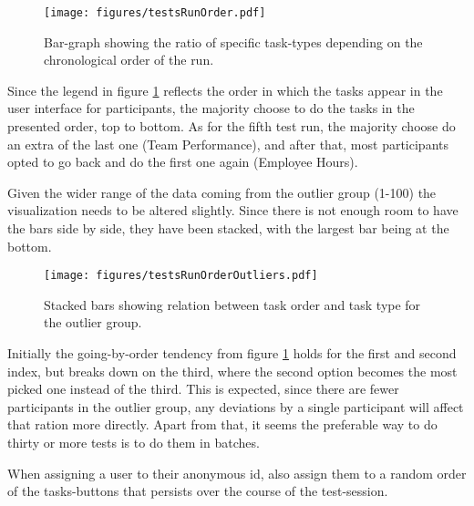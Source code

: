 		\vspace{-0.2cm}
    \begin{figure}[ht!]
      \centering
      \texttt{[image: figures/testsRunOrder.pdf]}
			\vspace{-0.1cm}
      \caption{
        Bar-graph showing the ratio of specific task-types depending on
        the chronological order of the run.
      }
      \label{label_testsRunOrder}
    \end{figure}

		\vspace{-0.1cm}
    Since the legend in figure \ref{label_testsRunOrder} reflects the order
    in which the tasks appear in the user interface for participants, the
    majority choose to do the tasks in the presented order, top to bottom.
    As for the fifth test run, the majority choose do an extra of the last
    one (Team Performance), and after that, most participants opted to go
    back and do the first one again (Employee Hours).

    Given the wider range of the data coming from the outlier group (1-100)
    the visualization needs to be altered slightly. Since there is not
    enough room to have the bars side by side, they have been stacked, with
    the largest bar being at the bottom.

		\vspace{-0.2cm}
    \begin{figure}[ht!]
      \centering
      \texttt{[image: figures/testsRunOrderOutliers.pdf]}
			\vspace{-0.2cm}
      \caption{
        Stacked bars showing relation between task order and task type for
        the outlier group.
      }
    \end{figure}

		\vspace{-0.4cm}
    Initially the going-by-order tendency from figure
    \ref{label_testsRunOrder} holds for the first and second index, but breaks down
    on the third, where the second option becomes the most picked one instead
    of the third. This is expected, since there are fewer participants in the
    outlier group, any deviations by a single participant will affect that
    ration more directly. Apart from that, it seems the preferable way to do
    thirty or more tests is to do them in batches.

		\iterchange
		When assigning a user to their anonymous id, also assign them to a random
		order of the tasks-buttons that persists over the course of the
		test-session.

